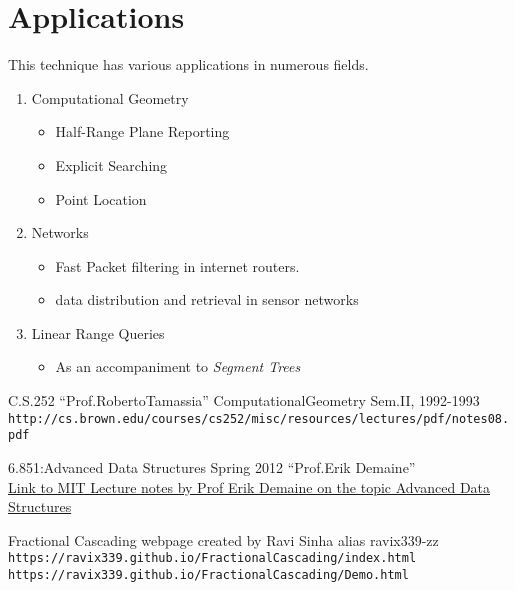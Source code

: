 \documentclass[11pt]{article}
\begin{document}
\pagebreak


\section{Applications}
This technique has various applications in numerous fields. \\
\begin{enumerate}
    \item Computational Geometry
    \begin{itemize}
        \item Half-Range Plane Reporting
        \item Explicit Searching 
        \item Point Location
    \end{itemize}
    \item Networks
    \begin{itemize}
        \item Fast Packet filtering in internet routers.
        \item data distribution and retrieval in sensor networks
    \end{itemize}
    \item Linear Range Queries
        \begin{itemize}
            \item As an accompaniment to \textit{Segment Trees}
        \end{itemize}
\end{enumerate}



\pagebreak 
\begin{thebibliography}{}

C.S.252 ``Prof.RobertoTamassia'' ComputationalGeometry Sem.II, 1992-1993
\\
\texttt{http://cs.brown.edu/courses/cs252/misc/resources/lectures/pdf/notes08.pdf}


6.851:Advanced Data Structures Spring 2012 ``Prof.Erik Demaine'' \\
\href{https://ocw.mit.edu/courses/electrical-engineering-and-computer-science/6-851-advanced-data-structures-spring-2012/calendar-and-notes/MIT6_851S12_L3.pdf}{Link to MIT Lecture notes by Prof Erik Demaine on the topic Advanced Data Structures}


Fractional Cascading webpage created by Ravi Sinha alias ravix339-zz \\
\texttt{https://ravix339.github.io/FractionalCascading/index.html} \\
\texttt{https://ravix339.github.io/FractionalCascading/Demo.html} \\


\end{thebibliography}
\end{document}
